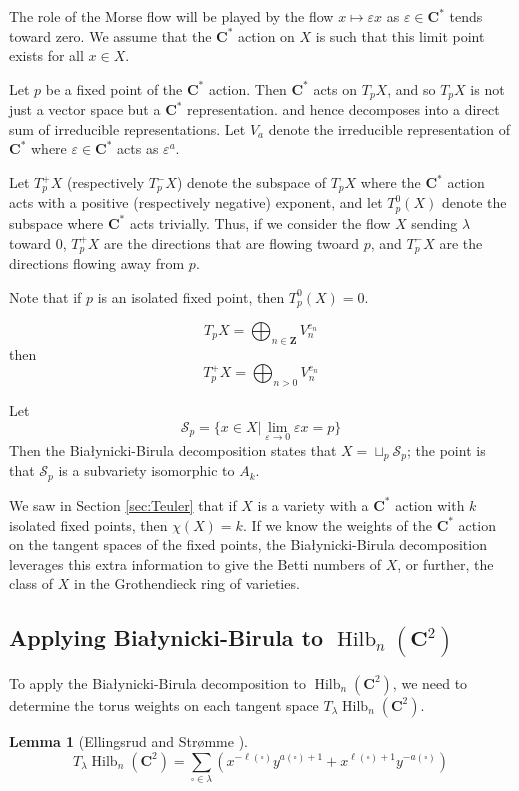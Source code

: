 \documentclass{amsart}[12pt]
\theoremstyle{definition}
\newtheorem{lemma}[dummy]{Lemma}
\newcommand{\Z}{\mathbf{Z}}
\newcommand{\C}{\mathbf{C}}
\DeclareMathOperator{\Hilb}{Hilb}
\begin{document}
The role of the Morse flow will be played by the flow $x\mapsto \varepsilon x$ as $\varepsilon\in\C^*$ tends toward zero.  We assume that the $\C^*$ action on $X$ is such that this limit point exists for all $x\in X$.  

Let $p$ be a fixed point of the $\C^*$ action.  Then $\C^*$ acts on $T_pX$, and so $T_pX$ is not just a vector space but a $\C^*$ representation.   and hence decomposes into a direct sum of irreducible representations.  Let $V_a$ denote the irreducible representation of $\C^*$ where $\varepsilon\in\C^*$ acts as $\varepsilon^a$.  


Let $T_p^+X$ (respectively $T_p^-X$) denote the subspace of $T_pX$ where the $\C^*$ action acts with a positive (respectively negative) exponent, and let $T_p^0(X)$ denote the subspace where $\C^*$ acts trivially.  Thus, if we consider the flow $X$ sending $\lambda$ toward 0, $T_p^+X$ are the directions that are flowing twoard $p$, and $T_p^-X$ are the directions flowing away from $p$.  

Note that if $p$ is an isolated fixed point, then $T_p^0(X)=0$.

$$T_pX=\bigoplus_{n\in\Z} V_n^{e_n}$$
then
$$T_p^+X=\bigoplus_{n>0} V_n^{e_n}$$

Let 
$$\mathcal{S}_p=\{x\in X|\lim_{\varepsilon\to 0} \varepsilon x=p\}$$
Then the Bia\l ynicki-Birula decomposition states that $X=\sqcup_{p}\mathcal{S}_p$; the point is that $\mathcal{S}_p$ is a subvariety isomorphic to $A_k$.


We saw in Section \ref{sec:Teuler} that if $X$ is a variety with a $\C^*$ action with $k$ isolated fixed points, then $\chi(X)=k$.  If we know the weights of the $\C^*$ action on the tangent spaces of the fixed points, the Bia\l ynicki-Birula decomposition leverages this extra information to give the Betti numbers of $X$, or further, the class of $X$ in the Grothendieck ring of varieties.

\subsection{Applying Bia\l ynicki-Birula to $\Hilb_n(\C^2)$}
To apply the Bia\l ynicki-Birula decomposition to $\Hilb_n(\C^2)$, we need to determine the torus weights on each tangent space $T_\lambda\Hilb_n(\C^2)$.

\begin{lemma}[Ellingsrud and Str\o mme \cite{ES}] \label{lem:torus-weights}
$$T_\lambda \Hilb_n(\C^2)=\sum_{\square\in\lambda} \left(x^{-\ell(\square)} y^{a(\square)+1}+x^{\ell(\square)+1}y^{-a(\square)}\right)$$
\end{lemma}
\end{document}
